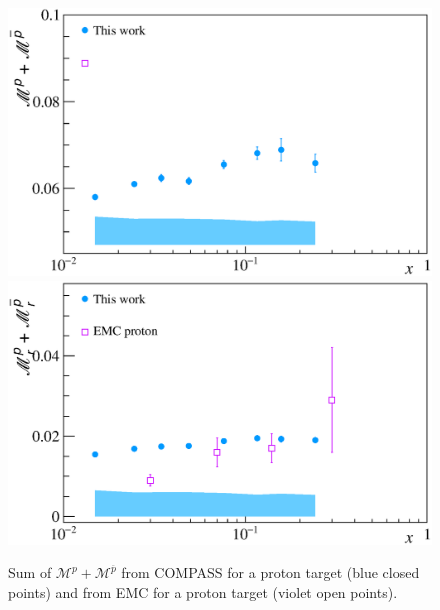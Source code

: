 \begin{figure}[!h]
  \centering
	\includegraphics[scale=0.5]{./gfx/Mult_p_sum.eps}
	\includegraphics[scale=0.5]{./gfx/Mult_p_sum_EMC.eps}
	\caption{Sum of $\mathscr{M}^{p}+\mathscr{M}^{\overline{p}}$ from COMPASS for a proton target (blue closed points) and from EMC for a proton target (violet open points).}
	\label{pic:psum}
\end{figure}

